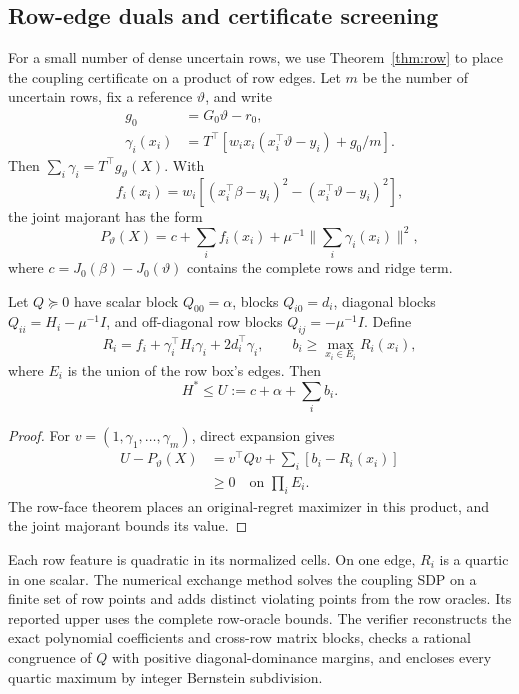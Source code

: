 \subsection{Row-edge duals and certificate screening}\label{app:edge-refinement-v22}
For a small number of dense uncertain rows, we use Theorem~\ref{thm:row} to place the coupling certificate on a product of row edges. Let $m$ be the number of uncertain rows, fix a reference $\vartheta$, and write
\begin{align*}
 g_0&=G_0\vartheta-r_0,\\
 \gamma_i(x_i)&=T^\top\!\left[w_i x_i(x_i^\top\vartheta-y_i)+g_0/m\right].
\end{align*}
Then $\sum_i\gamma_i=T^\top g_\vartheta(X)$. With
\[
 f_i(x_i)=w_i[(x_i^\top\beta-y_i)^2-(x_i^\top\vartheta-y_i)^2],
\]
the joint majorant has the form
\[
 P_\vartheta(X)=c+\sum_i f_i(x_i)+\mu^{-1}\Big\|\sum_i\gamma_i(x_i)\Big\|^2,
\]
where $c=J_0(\beta)-J_0(\vartheta)$ contains the complete rows and ridge term.

\begin{proposition}\label{prop:edge-dual-v22}
Let $Q\succeq0$ have scalar block $Q_{00}=\alpha$, blocks $Q_{i0}=d_i$, diagonal blocks $Q_{ii}=H_i-\mu^{-1}I$, and off-diagonal row blocks $Q_{ij}=-\mu^{-1}I$. Define
\[
 R_i=f_i+\gamma_i^\top H_i\gamma_i+2d_i^\top\gamma_i,
 \qquad b_i\ge\max_{x_i\in E_i}R_i(x_i),
\]
where $E_i$ is the union of the row box's edges. Then
\[
 H^*\le U:=c+\alpha+\sum_i b_i.
\]
\end{proposition}
\begin{proof}
For $v=(1,\gamma_1,\ldots,\gamma_m)$, direct expansion gives
\begin{align*}
 U-P_\vartheta(X)&=v^\top Qv+\sum_i[b_i-R_i(x_i)]\\
 &\ge0\quad\text{on }\prod_iE_i.
\end{align*}
The row-face theorem places an original-regret maximizer in this product, and the joint majorant bounds its value.
\end{proof}

Each row feature is quadratic in its normalized cells. On one edge, $R_i$ is a quartic in one scalar. The numerical exchange method solves the coupling SDP on a finite set of row points and adds distinct violating points from the row oracles. Its reported upper uses the complete row-oracle bounds. The verifier reconstructs the exact polynomial coefficients and cross-row matrix blocks, checks a rational congruence of $Q$ with positive diagonal-dominance margins, and encloses every quartic maximum by integer Bernstein subdivision.

